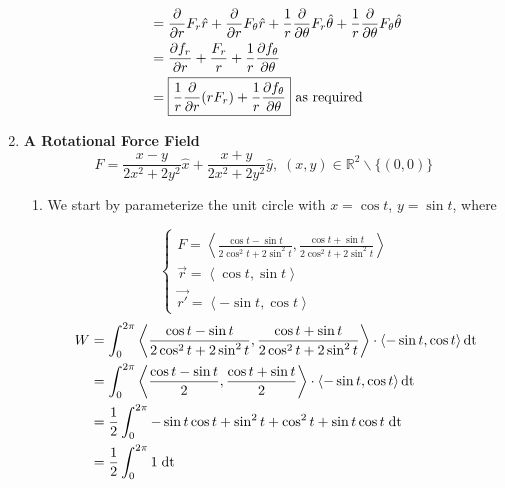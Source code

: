 \documentclass[12pt]{article}
\begin{document}
\begin{enumerate}
\begin{enumerate}
\begin{align*}
            &=\frac{\partial}{\partial r}F_r\hat{r}+\frac{\partial}{\partial r}F_\theta\hat{r}+\frac{1}{r}\frac{\partial}{\partial \theta}F_r\hat{{\bf \theta}}+\frac{1}{r}\frac{\partial}{\partial \theta}F_\theta\hat{{\bf \theta}}\\
            &=\frac{\partial f_r}{\partial r}+\frac{F_r}{r}+\frac{1}{r}\frac{\partial f_\theta}{\partial \theta}\\
            &=\boxed{\frac{1}{r}\frac{\partial}{\partial r}(rF_r)+\frac{1}{r}\frac{\partial f_\theta}{\partial \theta}} \text{ as required}
        \end{align*}
    \end{enumerate}
    \newpage
    \item \textbf{A Rotational Force Field}
    \begin{equation*}
        F=\frac{x-y}{2x^2+2y^2}\hat{x}+\frac{x+y}{2x^2+2y^2}\hat{y},\;(x,y)\in\mathbb{R}^2\backslash\{(0,0)\}
    \end{equation*}
    \vspace{-7pt}
    \begin{enumerate}
        \item We start by parameterize the unit circle with $x=\cos t$, $y=\sin t$, where
        \vspace{-5pt}
        \begin{center}
            \begin{equation*}
                \begin{cases}
                    F=\left<\frac{\cos t-\sin t}{2\cos^2t+2\sin^2t},\frac{\cos t+\sin t}{2\cos^2t+2\sin^2t}\right>\\
                    \Vec{r}=\left<\cos t,\sin t\right>\\
                    \Vec{r'}=\left<-\sin t,\cos t\right>
                \end{cases}
            \end{equation*}
            \begin{align*}
                W&=\int_0^{2\pi}\left<\frac{\cos t-\sin t}{2\cos^2t+2\sin^2t},\frac{\cos t+\sin t}{2\cos^2t+2\sin^2t}\right>\cdot\left<-\sin t,\cos t\right>{\rm dt}\\
                &=\int_0^{2\pi}\left<\frac{\cos t-\sin t}{2},\frac{\cos t+\sin t}{2}\right>\cdot\left<-\sin t,\cos t\right>{\rm dt}\\
                &=\frac{1}{2}\int_0^{2\pi}-\sin t\cos t+\sin^2t+\cos^2t+\sin t\cos t\;{\rm dt}\\
                &=\frac{1}{2}\int_0^{2\pi}1\;{\rm dt}\\

\end{align*}
\end{center}
\end{enumerate}
\end{enumerate}
\end{document}
